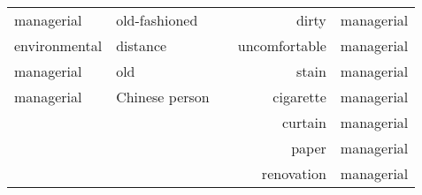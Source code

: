 \documentclass[review]{elsarticle}
\providecommand{\DIFaddendFL}{} %
\DeclareRobustCommand{\DIFaddendFL}{\DIFOaddendFL \let\includegraphics\DIFOincludegraphics} %
\begin{document}
\begin{table}[hbp]
{\begin{tabular}{lll|r|r|}
\multicolumn{1}{|l|}{managerial} & \multicolumn{1}{l|}{old-fashioned} &  & dirty & managerial \\ \cline{1-2} \cline{4-5} 
\multicolumn{1}{|l|}{environmental} & \multicolumn{1}{l|}{distance} &  & uncomfortable & managerial \\ \cline{1-2} \cline{4-5} 
\multicolumn{1}{|l|}{managerial} & \multicolumn{1}{l|}{old} &  & stain & managerial \\ \cline{1-2} \cline{4-5} 
\multicolumn{1}{|l|}{managerial} & \multicolumn{1}{l|}{Chinese person} &  & cigarette & managerial \\ \cline{1-2} \cline{4-5} 
 &  &  & curtain & managerial \\ \cline{4-5} 
 &  &  & paper & managerial \\ \cline{4-5} 
 &  &  & renovation & managerial \\ \cline{4-5} 
\end{tabular}%
}
\DIFaddendFL \end{table}
\end{document}
